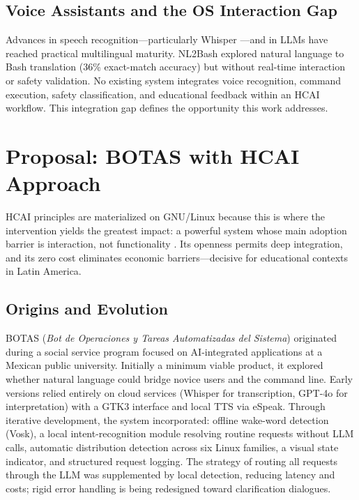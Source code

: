 \documentclass[12pt]{article}
\begin{document}
\subsection{Voice Assistants and the OS Interaction Gap}
\label{subsec:voice-gap}

Advances in speech recognition---particularly Whisper \cite{Radford2022}---and
in LLMs \cite{Brown2020, OpenAI2023} have reached practical multilingual maturity.
NL2Bash \cite{Lin2018} explored natural language to Bash translation (36\%
exact-match accuracy) but without real-time interaction or safety validation. No
existing system integrates voice recognition, command execution, safety
classification, and educational feedback within an HCAI workflow. This
integration gap defines the opportunity this work addresses.


\section{Proposal: BOTAS with HCAI Approach}
\label{sec:proposal}

HCAI principles are materialized on GNU/Linux because this is where the
intervention yields the greatest impact: a powerful system whose main adoption
barrier is interaction, not functionality \cite{Warschauer2004}. Its openness
permits deep integration, and its zero cost eliminates economic barriers---decisive
for educational contexts in Latin America.

\subsection{Origins and Evolution}
\label{subsec:origins}

BOTAS (\textit{Bot de Operaciones y Tareas Automatizadas del Sistema}) originated
during a social service program focused on AI-integrated applications at a Mexican
public university. Initially a minimum viable product, it explored whether natural
language could bridge novice users and the command line. Early versions relied
entirely on cloud services (Whisper for transcription, GPT-4o for interpretation)
with a GTK3 interface and local TTS via eSpeak. Through iterative development,
the system incorporated: offline wake-word detection (Vosk), a local
intent-recognition module resolving routine requests without LLM calls, automatic
distribution detection across six Linux families, a visual state indicator, and
structured request logging. The strategy of routing all requests through the LLM
was supplemented by local detection, reducing latency and costs; rigid error
handling is being redesigned toward clarification dialogues.
\end{document}
